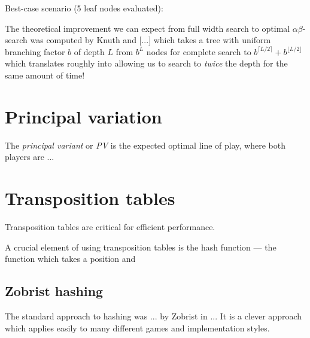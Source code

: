\documentclass[10pt,dvipdfmx]{report}
\newcommand{\ab}{{$\alpha\beta$}}
\begin{document}
Best-case scenario (5 leaf nodes evaluated):
\iffalse
\begin{center}
\begin{tikzpicture}%
  \tikzstyle{level 1}=[level distance=15mm,sibling distance=35mm]
  \tikzstyle{level 2}=[level distance=15mm,sibling distance=10mm]
  \tikzstyle{maxer}=[rectangle,draw,inner sep=2]
  \tikzstyle{miner}=[circle,draw,inner sep=1]
  \node(0)[maxer]{$=7$}
  child{node[miner]{$=7$}
    child{node{$7$} edge from parent[very thick]}
    child{node{$8$} edge from parent[semithick]}
    child{node{$9$} edge from parent[semithick]}
    edge from parent[very thick]
  }
  child{node[miner]{$\leq4$}
    child{node{$4$} edge from parent[semithick]}
    child{node{$5$} edge from parent[semithick,dashed] node{$=$}}
    child{node{$9$} edge from parent[semithick,dashed] node{$=$}}
  }
  child{node[miner]{$\leq1$}
    child{node{$1$} edge from parent[semithick]}
    child{node{$2$} edge from parent[semithick,dashed] node{$=$}}
    child{node{$9$} edge from parent[semithick,dashed] node{$=$}}
  };
\end{tikzpicture}
\end{center}
\fi

The theoretical improvement we can expect from full width search to optimal \ab-search
was computed by Knuth and [...] which takes a tree with uniform branching
factor $b$ of depth $L$ from $b^L$ nodes for complete search to $b^{\lceil L/2\rceil}+b^{\lfloor L/2\rfloor}$
which translates roughly into allowing us to search to {\em twice} the depth for the same amount of time!

\section{Principal variation}

The {\em principal variant} or {\em PV} is the expected
optimal line of play, where both players are ...

\section{Transposition tables}

Transposition tables are critical for efficient performance.

A crucial element of using transposition tables is the hash function --- the
function which takes a position and 

\subsection{Zobrist hashing}
The standard approach to hashing was ... by Zobrist in ...
It is a clever approach which applies easily to many different games
and implementation styles.
\end{document}
